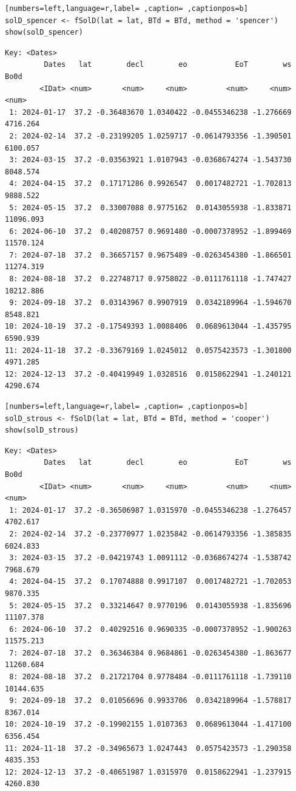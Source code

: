 \begin{lstlisting}[numbers=left,language=r,label= ,caption= ,captionpos=b]
solD_spencer <- fSolD(lat = lat, BTd = BTd, method = 'spencer')
show(solD_spencer)
\end{lstlisting}

\begin{verbatim}
Key: <Dates>
         Dates   lat        decl        eo           EoT        ws      Bo0d
        <IDat> <num>       <num>     <num>         <num>     <num>     <num>
 1: 2024-01-17  37.2 -0.36483670 1.0340422 -0.0455346238 -1.276669  4716.264
 2: 2024-02-14  37.2 -0.23199205 1.0259717 -0.0614793356 -1.390501  6100.057
 3: 2024-03-15  37.2 -0.03563921 1.0107943 -0.0368674274 -1.543730  8048.574
 4: 2024-04-15  37.2  0.17171286 0.9926547  0.0017482721 -1.702813  9888.522
 5: 2024-05-15  37.2  0.33007088 0.9775162  0.0143055938 -1.833871 11096.093
 6: 2024-06-10  37.2  0.40208757 0.9691480 -0.0007378952 -1.899469 11570.124
 7: 2024-07-18  37.2  0.36657157 0.9675489 -0.0263454380 -1.866501 11274.319
 8: 2024-08-18  37.2  0.22748717 0.9758022 -0.0111761118 -1.747427 10212.886
 9: 2024-09-18  37.2  0.03143967 0.9907919  0.0342189964 -1.594670  8548.821
10: 2024-10-19  37.2 -0.17549393 1.0088406  0.0689613044 -1.435795  6590.939
11: 2024-11-18  37.2 -0.33679169 1.0245012  0.0575423573 -1.301800  4971.285
12: 2024-12-13  37.2 -0.40419949 1.0328516  0.0158622941 -1.240121  4290.674
\end{verbatim}

\begin{lstlisting}[numbers=left,language=r,label= ,caption= ,captionpos=b]
solD_strous <- fSolD(lat = lat, BTd = BTd, method = 'cooper')
show(solD_strous)
\end{lstlisting}

\begin{verbatim}
Key: <Dates>
         Dates   lat        decl        eo           EoT        ws      Bo0d
        <IDat> <num>       <num>     <num>         <num>     <num>     <num>
 1: 2024-01-17  37.2 -0.36506987 1.0315970 -0.0455346238 -1.276457  4702.617
 2: 2024-02-14  37.2 -0.23770977 1.0235842 -0.0614793356 -1.385835  6024.833
 3: 2024-03-15  37.2 -0.04219743 1.0091112 -0.0368674274 -1.538742  7968.679
 4: 2024-04-15  37.2  0.17074888 0.9917107  0.0017482721 -1.702053  9870.335
 5: 2024-05-15  37.2  0.33214647 0.9770196  0.0143055938 -1.835696 11107.378
 6: 2024-06-10  37.2  0.40292516 0.9690335 -0.0007378952 -1.900263 11575.213
 7: 2024-07-18  37.2  0.36346384 0.9684861 -0.0263454380 -1.863677 11260.684
 8: 2024-08-18  37.2  0.21721704 0.9778484 -0.0111761118 -1.739110 10144.635
 9: 2024-09-18  37.2  0.01056696 0.9933706  0.0342189964 -1.578817  8367.014
10: 2024-10-19  37.2 -0.19902155 1.0107363  0.0689613044 -1.417100  6356.454
11: 2024-11-18  37.2 -0.34965673 1.0247443  0.0575423573 -1.290358  4835.353
12: 2024-12-13  37.2 -0.40651987 1.0315970  0.0158622941 -1.237915  4260.830
\end{verbatim}

